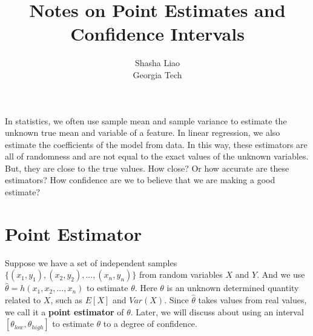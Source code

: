 \documentclass[twoside,12pt]{article}
\begin{document}
\title{Notes on Point Estimates and Confidence Intervals}
\author {Shasha Liao \\ Georgia Tech}
\maketitle
In statistics, we often use sample mean and sample variance to estimate the unknown true mean and variable of a feature. In linear regression, we also estimate the coefficients of the model from data. In this way, these estimators are all of randomness and are not equal to the exact values of the unknown variables. But, they are close to the true values. How close? Or how accurate are these estimators? How confidence are we to believe that we are making a good estimate? \\
\section{Point Estimator}
Suppose we have a set of independent samples $\{(x_1, y_1), (x_2, y_2), ..., (x_n, y_n)\}$ from random variables $X$ and $Y$. And we use $\hat{\theta} = h(x_1, x_2, ..., x_n)$ to estimate $\theta$. Here $\theta$ is an unknown determined quantity related to $X$, such as $E[X]$ and $Var(X)$. Since $\hat{\theta}$ takes values from real values, we call it a \textbf{point estimator} of $\theta$. Later, we will discuss about using an interval $[\theta_{low}, \theta_{high}]$ to estimate $\theta$ to a degree of confidence. \\
\end{document}
